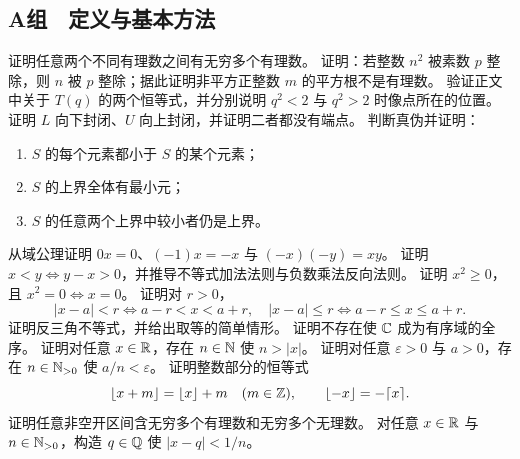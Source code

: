 \subsection*{A组　定义与基本方法}
\begin{enumerate}[label=\textbf{\thechapter.\arabic*.}]
  证明任意两个不同有理数之间有无穷多个有理数。
  证明：若整数 \(n^2\) 被素数 \(p\) 整除，则 \(n\) 被 \(p\) 整除；据此证明非平方正整数 \(m\) 的平方根不是有理数。
  验证正文中关于 \(T(q)\) 的两个恒等式，并分别说明 \(q^2<2\) 与 \(q^2>2\) 时像点所在的位置。
  证明 \(L\) 向下封闭、\(U\) 向上封闭，并证明二者都没有端点。
  判断真伪并证明：
 \begin{enumerate}[label=(\arabic*)]
  \item \(S\) 的每个元素都小于 \(S\) 的某个元素；
  \item \(S\) 的上界全体有最小元；
  \item \(S\) 的任意两个上界中较小者仍是上界。
 \end{enumerate}
  从域公理证明 \(0x=0\)、\((-1)x=-x\) 与 \((-x)(-y)=xy\)。
  证明 \(x<y\Longleftrightarrow y-x>0\)，并推导不等式加法法则与负数乘法反向法则。
  证明 \(x^2\ge0\)，且 \(x^2=0\Longleftrightarrow x=0\)。
  证明对 \(r>0\)，
 \[
 |x-a|<r\Longleftrightarrow a-r<x<a+r,
 \quad
 |x-a|\le r\Longleftrightarrow a-r\le x\le a+r.
 \]
  证明反三角不等式，并给出取等的简单情形。
  证明不存在使 \(\mathbb{C}\) 成为有序域的全序。
  证明对任意 \(x\in\mathbb{R}\)，存在 \(n\in\mathbb{N}\) 使 \(n>|x|\)。
  证明对任意 \(\varepsilon>0\) 与 \(a>0\)，存在 \(n\in\mathbb{N}_{>0}\) 使 \(a/n<\varepsilon\)。
  证明整数部分的恒等式
 \[
 \lfloor x+m\rfloor=\lfloor x\rfloor+m\quad(m\in\mathbb{Z}),
 \qquad \lfloor-x\rfloor=-\lceil x\rceil.
 \]
  证明任意非空开区间含无穷多个有理数和无穷多个无理数。
  对任意 \(x\in\mathbb{R}\) 与 \(n\in\mathbb{N}_{>0}\)，构造 \(q\in\mathbb{Q}\) 使 \(|x-q|<1/n\)。
\end{enumerate}

